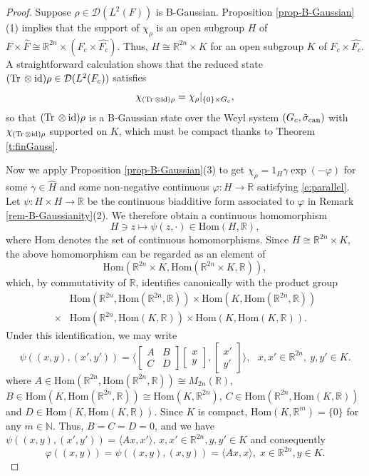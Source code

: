 \documentclass[12pt,reqno]{amsart}
\theoremstyle{definition}
\theoremstyle{definition}
\theoremstyle{definition}
\numberwithin{thm}{section}
\numberwithin{equation}{section}
\newcommand{\Real}{\mathbb R}
\newcommand{\la}{\langle}
\newcommand{\ra}{\rangle}
\newcommand{\mc}[1]{\mathcal #1}
\newcommand{\tr}{{\rm Tr}\,}
\newcommand{\id}{{\rm id}}
\newcommand{\ten}{\otimes}
\newcommand{\wh}[1]{\widehat{#1}}
\newcommand{\vphi}{\varphi}
\newcommand{\bN}{\mathbb{N}}
\newcommand{\bR}{\mathbb{R}}
\begin{document}
\begin{proof} Suppose $\rho\in\mc D(L^2(F))$ is B-Gaussian. Proposition \ref{prop-B-Gaussian}(1) implies that the support of $\chi_\rho$ is an open subgroup $H$ of $F\times\wh{F}\cong\bR^{2n}\times(F_c\times\wh{F_c})$. Thus, $H\cong \bR^{2n}\times K$ for an open subgroup $K$ of $F_c\times\wh{F_c}$. A straightforward calculation shows that the reduced state
$(\tr\ten\id)\rho\in\mc{D}(L^2(F_c))$ satisfies
$$\chi_{(\tr\ten\id)\rho}=\chi_\rho|_{\{0\}\times G_c},$$
so that $(\tr\ten\id)\rho$ is a B-Gaussian state over the Weyl system $(G_c, \tilde{\sigma}_{\rm can})$ with $\chi_{(\tr\ten\id)\rho}$ supported on $K$, which must be compact thanks to Theorem \ref{t:finGauss}.

Now we apply Proposition \ref{prop-B-Gaussian}(3) to get $\chi_\rho=1_H\gamma \exp(-\vphi)$ for some $\gamma \in \wh{H}$ and some non-negative continuous $\varphi: H \to \Real$ satisfying \eqref{e:parallel}. Let $\psi:H\times H\rightarrow\bR$ be the continuous biadditive form associated to $\varphi$ in Remark \ref{rem-B-Gaussianity}(2).
We therefore obtain a continuous homomorphism
$$H\ni z\mapsto \psi(z,\cdot)\in\mathrm{Hom}(H,\bR),$$
where $\mathrm{Hom}$ denotes the set of continuous homomorphisms. Since $H\cong \bR^{2n}\times K$, the above homomorphism can be regarded as an element of 
$$\mathrm{Hom}(\bR^{2n}\times K,\mathrm{Hom}(\bR^{2n}\times K,\bR)),$$
which, by commutativity of $\bR$, identifies canonically with the product group
\begin{align*}&\mathrm{Hom}(\bR^{2n},\mathrm{Hom}(\bR^{2n},\bR))\times\mathrm{Hom}(K,\mathrm{Hom}(\bR^{2n},\bR))\\
\times&\mathrm{Hom}(\bR^{2n},\mathrm{Hom}(K,\bR))\times\mathrm{Hom}(K,\mathrm{Hom}(K,\bR)).\end{align*}
Under this identification, we may write
$$\psi((x,y),(x',y'))=\bigg\la\begin{bmatrix} A & B\\ C & D\end{bmatrix}\begin{bmatrix} x \\ y\end{bmatrix},\begin{bmatrix} x' \\ y'\end{bmatrix}\bigg\ra,\ \ \ x,x'\in\bR^{2n}, \ y,y'\in K.$$
where $A\in\mathrm{Hom}(\bR^{2n},\mathrm{Hom}(\bR^{2n},\bR))\cong M_{2n}(\bR)$, $B\in \mathrm{Hom}(K,\mathrm{Hom}(\bR^{2n},\bR))\cong\mathrm{Hom}(K,\bR^{2n})$, $C\in\mathrm{Hom}(\bR^{2n},\mathrm{Hom}(K,\bR))$ and $D\in\mathrm{Hom}(K,\mathrm{Hom}(K,\bR))$. Since $K$ is compact, $\mathrm{Hom}(K,\bR^m)=\{0\}$ for any $m\in\bN$. Thus, $B=C=D=0$, and we have
$\psi((x,y),(x',y'))= \la Ax,x'\ra,\, x,x'\in\bR^{2n}, y,y'\in K$ and consequently
    $$\varphi((x,y)) = \psi((x,y),(x,y)) = \la Ax, x \ra,\; x\in\bR^{2n}, y\in K.$$


\end{proof}
\end{document}
